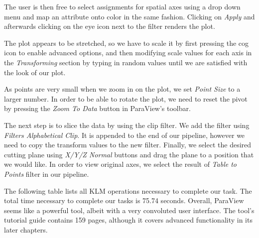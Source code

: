 \documentclass[thesis=M,english,hidelinks]{FITthesisXE}[2012/06/26]
\begin{document}
The user is then free to select assignments for spatial axes using a drop down menu and map an attribute onto color in the same fashion. Clicking on \emph{Apply} and afterwards clicking on the eye icon next to the filter renders the plot.

The plot appears to be stretched, so we have to scale it by first pressing the cog icon to enable advanced options, and then modifying scale values for each axis in the \emph{Transforming} section by typing in random values until we are satisfied with the look of our plot.

As points are very small when we zoom in on the plot, we set \emph{Point Size} to a larger number. In order to be able to rotate the plot, we need to reset the pivot by pressing the \emph{Zoom To Data} button in ParaView's toolbar.

The next step is to slice the data by using the clip filter. We add the filter using \emph{Filters \textrightarrow{} Alphabetical \textrightarrow{} Clip}. It is appended to the end of our pipeline, however we need to copy the transform values to the new filter. Finally, we select the desired cutting plane using \emph{X/Y/Z Normal} buttons and drag the plane to a position that we would like. In order to view original axes, we select the result of \emph{Table to Points} filter in our pipeline.

The following table lists all KLM operations necessary to complete our task. The total time necessary to complete our tasks is 75.74 seconds. Overall, ParaView seems like a powerful tool, albeit with a very convoluted user interface. The tool's tutorial guide contains 159 pages, although it covers advanced functionality in its later chapters.
\end{document}
